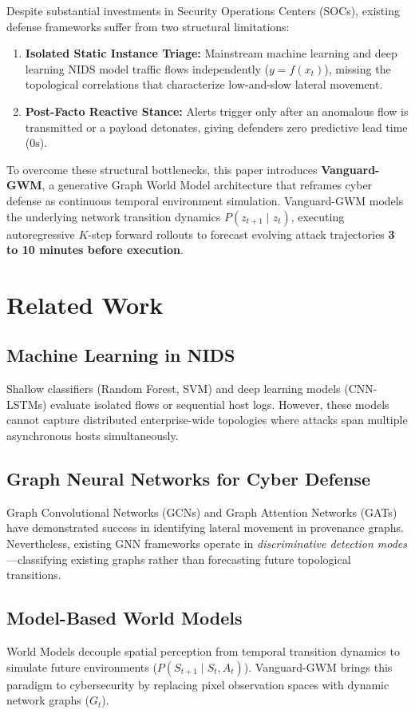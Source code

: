 \documentclass[conference]{IEEEtran}
\begin{document}
Despite substantial investments in Security Operations Centers (SOCs), existing defense frameworks suffer from two structural limitations:
\begin{enumerate}
    \item \textbf{Isolated Static Instance Triage:} Mainstream machine learning and deep learning NIDS model traffic flows independently ($y = f(x_t)$), missing the topological correlations that characterize low-and-slow lateral movement.
    \item \textbf{Post-Facto Reactive Stance:} Alerts trigger only after an anomalous flow is transmitted or a payload detonates, giving defenders zero predictive lead time ($0\text{s}$).
\end{enumerate}

To overcome these structural bottlenecks, this paper introduces \textbf{Vanguard-GWM}, a generative Graph World Model architecture that reframes cyber defense as continuous temporal environment simulation. Vanguard-GWM models the underlying network transition dynamics $P(z_{t+1} \mid z_t)$, executing autoregressive $K$-step forward rollouts to forecast evolving attack trajectories \textbf{3 to 10 minutes before execution}.

\section{Related Work}
\subsection{Machine Learning in NIDS}
Shallow classifiers (Random Forest, SVM) and deep learning models (CNN-LSTMs) evaluate isolated flows or sequential host logs. However, these models cannot capture distributed enterprise-wide topologies where attacks span multiple asynchronous hosts simultaneously.

\subsection{Graph Neural Networks for Cyber Defense}
Graph Convolutional Networks (GCNs) and Graph Attention Networks (GATs) have demonstrated success in identifying lateral movement in provenance graphs. Nevertheless, existing GNN frameworks operate in \textit{discriminative detection modes}---classifying existing graphs rather than forecasting future topological transitions.

\subsection{Model-Based World Models}
World Models decouple spatial perception from temporal transition dynamics to simulate future environments ($P(S_{t+1} \mid S_t, A_t)$). Vanguard-GWM brings this paradigm to cybersecurity by replacing pixel observation spaces with dynamic network graphs ($G_t$).
\end{document}
